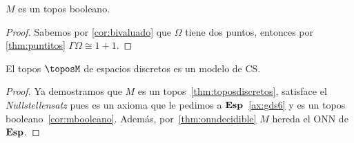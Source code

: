 \begin{corollary}[label=cor:mbooleano]
  $M$ es un topos booleano.
\end{corollary}
\begin{proof}
  Sabemos por \ref{cor:bivaluado} que $\Omega$ tiene dos puntos, entonces por \ref{thm:puntitos} $\Gamma\Omega \cong 1+1$.
\end{proof}

\begin{theorem}[label=thm:modelocs]
    El topos $\toposM$ de espacios discretos es un modelo de CS.
\end{theorem}
\begin{proof}
    Ya demostramos que $M$ es un topos~\ref{thm:toposdiscretos}, satisface el \textit{Nullstellensatz} pues es un axioma que le pedimos a $\mathbf{Esp}$~\ref{ax:gds6} y
    es un topos booleano~\ref{cor:mbooleano}. Además, por~\ref{thm:onndecidible} $M$ hereda el ONN de $\mathbf{Esp}$.
\end{proof}